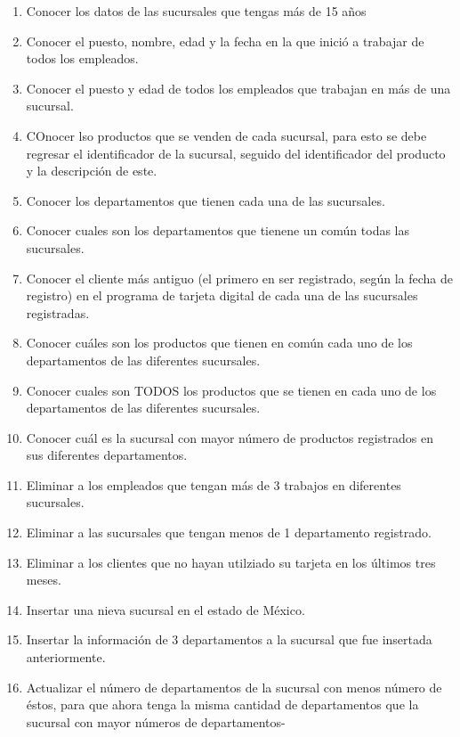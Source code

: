 \documentclass{article}
\begin{document}
    \begin{enumerate}
        \item {
            Conocer los datos de las sucursales que tengas más de 15 años
        }
        \item {
            Conocer el puesto, nombre, edad y la fecha en la que inició a
            trabajar de todos los empleados.
        }
        \item {
            Conocer el puesto y edad de todos los empleados que trabajan en más 
            de una sucursal.
        }
        \item {
            COnocer lso productos que se venden de cada sucursal, para esto se 
            debe regresar el identificador de la sucursal, seguido del
            identificador del producto y la descripción de este.
        }
        \item {
            Conocer los departamentos que tienen cada una de las sucursales.
        }
        \item {
            Conocer cuales son los departamentos que tienene un común todas las 
            sucursales.
        }
        \item {
            Conocer el cliente más antiguo (el primero en ser registrado, según
            la fecha de registro) en el programa de tarjeta digital de cada una
            de las sucursales registradas.
        }
        \item {
            Conocer cuáles son los productos que tienen en común cada uno de los
            departamentos de las diferentes sucursales.
        }
        \item {
            Conocer cuales son TODOS los productos que se tienen en cada uno de
            los departamentos de las diferentes sucursales.
        }
        \item {
            Conocer cuál es la sucursal con mayor número de productos
            registrados en sus diferentes departamentos.
        }
        \item {
            Eliminar a los empleados que tengan más de 3 trabajos en diferentes 
            sucursales.
        }
        \item {
            Eliminar a las sucursales que tengan menos de 1 departamento
            registrado.
        }
        \item {
            Eliminar a los clientes que no hayan utilziado su tarjeta en los
            últimos tres meses.
        }
        \item {
            Insertar una nieva sucursal en el estado de México.
        }
        \item {
            Insertar la información de 3 departamentos a la sucursal que fue
            insertada anteriormente.
        }
        \item {
            Actualizar el número de departamentos de la sucursal con menos
            número de éstos, para que ahora tenga la misma cantidad de departamentos
            que la sucursal con mayor números de departamentos-
        }
    \end{enumerate}
\end{document}

